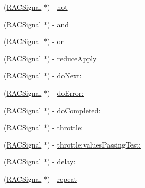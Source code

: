 \begin{DoxyCompactItemize}
\item 
(\mbox{\hyperlink{interface_r_a_c_signal}{R\+A\+C\+Signal}} $\ast$) -\/ \mbox{\hyperlink{category_r_a_c_signal_07_operations_08_a53de1c418b57ee4c60d20f561db04717}{not}}
\item 
(\mbox{\hyperlink{interface_r_a_c_signal}{R\+A\+C\+Signal}} $\ast$) -\/ \mbox{\hyperlink{category_r_a_c_signal_07_operations_08_a4a12f1ef58487260894d1ef37dbb9c9d}{and}}
\item 
(\mbox{\hyperlink{interface_r_a_c_signal}{R\+A\+C\+Signal}} $\ast$) -\/ \mbox{\hyperlink{category_r_a_c_signal_07_operations_08_aaf19b8314c8e554a7e5140ebffcd4f98}{or}}
\item 
(\mbox{\hyperlink{interface_r_a_c_signal}{R\+A\+C\+Signal}} $\ast$) -\/ \mbox{\hyperlink{category_r_a_c_signal_07_operations_08_a60241be15dba6de172d2ab14be09b657}{reduce\+Apply}}
\item 
(\mbox{\hyperlink{interface_r_a_c_signal}{R\+A\+C\+Signal}} $\ast$) -\/ \mbox{\hyperlink{category_r_a_c_signal_07_operations_08_a36028c2d987159f5210840358f4877c9}{do\+Next\+:}}
\item 
(\mbox{\hyperlink{interface_r_a_c_signal}{R\+A\+C\+Signal}} $\ast$) -\/ \mbox{\hyperlink{category_r_a_c_signal_07_operations_08_ac97a1fc7c03123a75746f2602b7444b4}{do\+Error\+:}}
\item 
(\mbox{\hyperlink{interface_r_a_c_signal}{R\+A\+C\+Signal}} $\ast$) -\/ \mbox{\hyperlink{category_r_a_c_signal_07_operations_08_af88fe4c330bad925ed164ad8f12bdcc8}{do\+Completed\+:}}
\item 
(\mbox{\hyperlink{interface_r_a_c_signal}{R\+A\+C\+Signal}} $\ast$) -\/ \mbox{\hyperlink{category_r_a_c_signal_07_operations_08_a2542ae804d05ec734d0f4d2fa8c3ac93}{throttle\+:}}
\item 
(\mbox{\hyperlink{interface_r_a_c_signal}{R\+A\+C\+Signal}} $\ast$) -\/ \mbox{\hyperlink{category_r_a_c_signal_07_operations_08_a0310fbee83b4ca1b1daca25daf24f41b}{throttle\+:values\+Passing\+Test\+:}}
\item 
(\mbox{\hyperlink{interface_r_a_c_signal}{R\+A\+C\+Signal}} $\ast$) -\/ \mbox{\hyperlink{category_r_a_c_signal_07_operations_08_adc28e5c64d2e6ec8c5ab8465fa6c89b4}{delay\+:}}
\item 
\mbox{\label{category_r_a_c_signal_07_operations_08_a37268af56c884572c44827ba13367c2d}} 
(\mbox{\hyperlink{interface_r_a_c_signal}{R\+A\+C\+Signal}} $\ast$) -\/ \mbox{\hyperlink{category_r_a_c_signal_07_operations_08_a37268af56c884572c44827ba13367c2d}{repeat}}

\end{DoxyCompactItemize}
